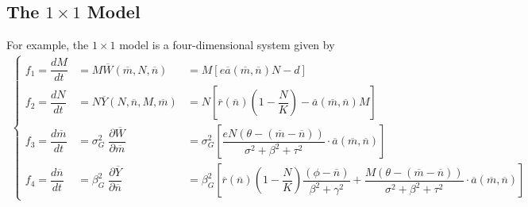 \documentclass[12pt]{article}
\begin{document}
\subsection*{The $1\times1$ Model}
\noindent For example, the $1\times1$ model is a four-dimensional system given by
\begin{align*}
	\left\{\begin{array}{lll}
		f_1 = \dfrac{dM}{dt} &= M \overline{W}(\overline{m}, N, \overline{n}) &= M \left[e\overline{a}(\overline{m}, \overline{n})N - d\right] \\[.5cm]
		f_2 = \dfrac{dN}{dt} &= N \overline{Y}(N, \overline{n}, M, \overline{m}) &= N \left[\overline{r}(\overline{n}) \left(1 - \dfrac{N}{K} \right) - \overline{a}(\overline{m}, \overline{n}) M\right] \\[.5cm]
		f_3 = \dfrac{d\overline{m}}{dt} &= \sigma_{G}^2 \; \dfrac{\partial \overline{W}}{\partial \overline{m}} &= \sigma_{G}^2 \left[\dfrac{eN(\theta - (\overline{m} - \overline{n}))}{\sigma^2 + \beta^2 + \tau^2} \cdot \overline{a}(\overline{m}, \overline{n})\right]\\[.5cm]
		f_4 = \dfrac{d\overline{n}}{dt} &= \beta_{G}^2 \; \dfrac{\partial \overline{Y}}{\partial \overline{n}} &= \beta_{G}^2 \left[\overline{r}(\overline{n})\left(1 - \dfrac{N}{K}\right)\dfrac{(\phi - \overline{n})}{\beta^2 + \gamma^2} + \dfrac{M(\theta - (\overline{m} - \overline{n}))}{\sigma^2 + \beta^2 + \tau^2} \cdot \overline{a}(\overline{m}, \overline{n})\right]
	\end{array}\right.
\end{align*}
\end{document}
